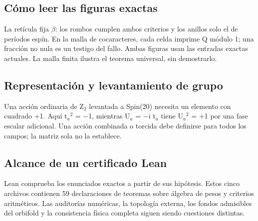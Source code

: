 \documentclass[11pt,a4paper]{article}
\begin{document}
\subsection*{Cómo leer las figuras exactas}
La retícula fija \ensuremath{\beta}: los rombos cumplen ambos criterios y los anillos solo el de períodos espín. En la malla de cocaracteres, cada celda imprime Q módulo 1; una fracción no nula es un testigo del fallo. Ambas figuras usan las entradas exactas actuales. La malla finita ilustra el teorema universal, sin demostrarlo.

\subsection*{Representación y levantamiento de grupo}
Una acción ordinaria de Z\ensuremath{{}_{2}} levantada a Spin(20) necesita un elemento con cuadrado +1. Aquí t\ensuremath{{}_{a}}\ensuremath{{}^{2}} = \ensuremath{-}1, mientras U\ensuremath{{}_{a}} = \ensuremath{-}i t\ensuremath{{}_{a}} tiene U\ensuremath{{}_{a}}\ensuremath{{}^{2}} = +1 por una fase escalar adicional. Una acción combinada o torcida debe definirse para todos los campos; la matriz sola no la establece.

\subsection*{Alcance de un certificado Lean}
Lean comprueba los enunciados exactos a partir de sus hipótesis. Estos cinco archivos contienen 59 declaraciones de teoremas sobre álgebra de pesos y criterios aritméticos. Las auditorías numéricas, la topología externa, los fondos admisibles del orbifold y la consistencia física completa siguen siendo cuestiones distintas.
\end{document}

